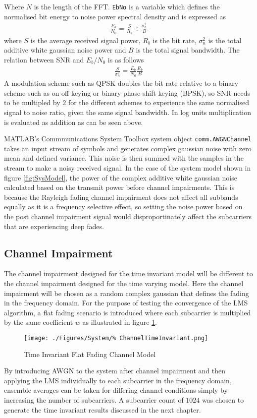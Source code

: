 Where $N$ is the length of the FFT. \texttt{EbNo} is a %
variable which defines the normalised bit energy %
to noise power spectral density and is %
expressed as
\begin{align}
	\frac{E_b}{N_0} = \frac{S}{R_b} \div 
	\frac{\sigma_n^{2}}{B}
\end{align}
where $S$ is the average received signal power, %
$R_b$ is the bit rate, $\sigma_n^{2}$ is the %
total additive white gaussian noise power and %
$B$ is the total signal bandwidth. The relation %
between SNR and $E_b/N_0$ is as follows
\begin{align}
	\frac{S}{\sigma_n^{2}} = \frac{E_b}{N_0}
	\frac{R_b}{B}
\end{align}
A modulation scheme such as QPSK doubles the bit %
rate relative to a binary scheme such as on off %
keying or binary phase shift keying (BPSK), so %
SNR needs to be multipled by $2$ for the different %
schemes to experience the same normalised %
signal to noise ratio, given the same signal bandwidth. %
In log units multiplication %
is evaluated as addition as can be seen above.

MATLAB's Commmunications System Toolbox system object %
\texttt{comm.AWGNChannel} \cite{AWGNChannel} takes an %
input stream of %
symbols and generates complex gaussian noise with %
zero mean and defined variance. This noise is then %
summed with the samples in the stream to make a noisy %
received signal. In the case of the system model shown in %
figure \ref{fig:SysModel}, the power of the complex %
additive white gaussian noise calculated based on the transmit %
power before channel impairments. This is because the Rayleigh %
fading channel impairment does not affect all subbands equally as %
it is a frequency selective effect, so setting the noise power based %
on the post channel impairment signal would disproportinately affect %
the subcarriers that are experiencing deep fades.

\subsection{Channel Impairment}
\label{sec:TIChannelImpairment}
The channel impairment designed for the time invariant model %
will be different to the channel impairment designed for the time varying model. %
Here the channel impairment will be chosen as a random complex gaussian that %
defines the fading in the frequency domain. For the purpose of testing the convergence %
of the LMS algorithm, a flat fading scenario is introduced where each subcarrier %
is multiplied by the same coefficient $w$ as illustrated in figure \ref{fig:TIChannel}.
\begin{figure}[ht]
	\texttt{[image: ./Figures/System/\%
	ChannelTimeInvariant.png]}
	\caption{Time Invariant Flat Fading Channel Model}
	\label{fig:TIChannel}
\end{figure}
By introducing AWGN to the system after channel impairment and then %
applying the LMS individually to each subcarrier in the frequency domain, %
ensemble averages can be taken for differing channel conditions simply by %
increasing the number of subcarriers. A subcarrier count of $1024$ was %
chosen to generate the time invariant results discussed in the next chapter. %

